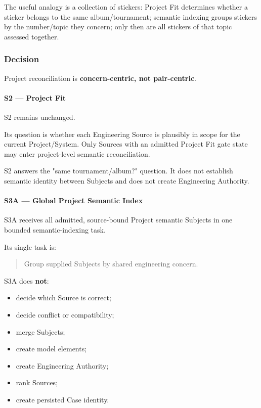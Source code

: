 The useful analogy is a collection of stickers: Project Fit determines whether a sticker belongs to the same album/tournament; semantic indexing groups stickers by the number/topic they concern; only then are all stickers of that topic assessed together.

\hypertarget{decision-19}{%
\subsubsection{Decision}\label{decision-19}}

Project reconciliation is \textbf{concern-centric, not pair-centric}.

\hypertarget{s2--project-fit}{%
\paragraph{S2 --- Project Fit}\label{s2--project-fit}}

S2 remains unchanged.

Its question is whether each Engineering Source is plausibly in scope for the current Project/System. Only Sources with an admitted Project Fit gate state may enter project-level semantic reconciliation.

S2 answers the "same tournament/album?" question. It does not establish semantic identity between Subjects and does not create Engineering Authority.

\hypertarget{s3a--global-project-semantic-index}{%
\paragraph{S3A --- Global Project Semantic Index}\label{s3a--global-project-semantic-index}}

S3A receives all admitted, source-bound Project semantic Subjects in one bounded semantic-indexing task.

Its single task is:

\begin{quote}
Group supplied Subjects by shared engineering concern.
\end{quote}

S3A does \textbf{not}:

\begin{itemize}
\tightlist
\item
  decide which Source is correct;
\item
  decide conflict or compatibility;
\item
  merge Subjects;
\item
  create model elements;
\item
  create Engineering Authority;
\item
  rank Sources;
\item
  create persisted Case identity.
\end{itemize}

